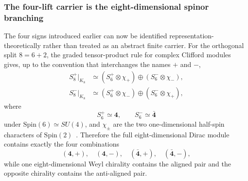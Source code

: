 \documentclass[11pt]{article}
\theoremstyle{definition}\newtheorem{definition}[theorem]{Definition}
\theoremstyle{remark}\newtheorem{remark}[theorem]{Remark}\newtheorem{conjecture}[theorem]{Conjecture}
\begin{document}
\subsubsection{The four-lift carrier is the eight-dimensional spinor branching}
The four signs introduced earlier can now be identified representation-theoretically rather than treated as an abstract finite carrier. For the orthogonal split $8=6+2$, the graded tensor-product rule for complex Clifford modules gives, up to the convention that interchanges the names $+$ and $-$,
\begin{align}
 S_8^+\big|_{K_8}
 &\simeq
 (S_6^+\otimes\chi_+)
 \oplus
 (S_6^-\otimes\chi_-),\label{eq:spin8branchplus}\\
 S_8^-\big|_{K_8}
 &\simeq
 (S_6^+\otimes\chi_-)
 \oplus
 (S_6^-\otimes\chi_+),\label{eq:spin8branchminus}
\end{align}
where
\begin{equation}
 S_6^+\simeq\mathbf4,
 \qquad
 S_6^-\simeq\bar{\mathbf4}
\end{equation}
under $\mathrm{Spin}(6)\simeq SU(4)$, and $\chi_\pm$ are the two one-dimensional half-spin characters of $\mathrm{Spin}(2)$~\cite{LawsonMichelsohn1989}. Therefore the full eight-dimensional Dirac module contains exactly the four combinations
\begin{equation}\label{eq:geometricfourlifts}
 \boxed{
 (\mathbf4,+),\quad
 (\mathbf4,-),\quad
 (\bar{\mathbf4},+),\quad
 (\bar{\mathbf4},-),}
\end{equation}
while one eight-dimensional Weyl chirality contains the aligned pair and the opposite chirality contains the anti-aligned pair.
\end{document}
